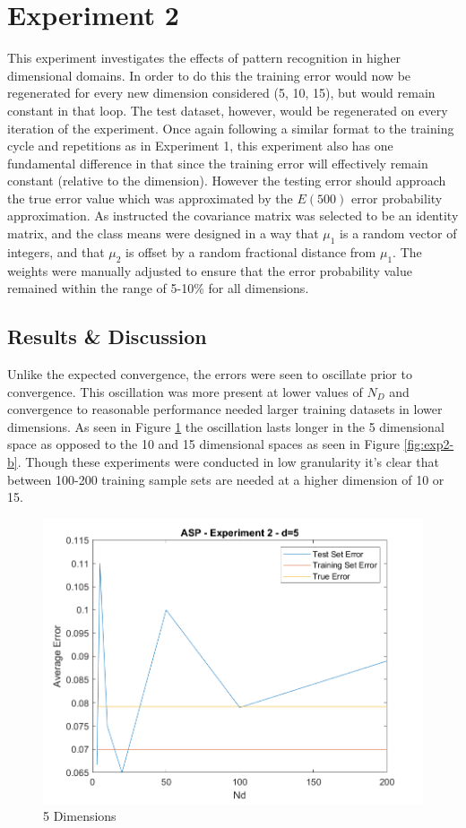 \section{Experiment 2}
This experiment investigates the effects of pattern recognition in higher dimensional domains. In order to do this the training error would now be regenerated for every new dimension considered (5, 10, 15), but would remain constant in that loop. The test dataset, however, would be regenerated on every iteration of the experiment. Once again following a similar format to the training cycle and repetitions as in Experiment 1, this experiment also has one fundamental difference in that since the training error will effectively remain constant (relative to the dimension). However the testing error should approach the true error value which was approximated by the $E(500)$ error probability approximation. As instructed the covariance matrix was selected to be an identity matrix, and the class means were designed in a way that $\mu_{1}$ is a random vector of integers, and that $\mu_{2}$ is offset by a random fractional distance from $\mu_{1}$. The weights were manually adjusted to ensure that the error probability value remained within the range of 5-10\% for all dimensions.

\subsection{Results \& Discussion}
Unlike the expected convergence, the errors were seen to oscillate prior to convergence. This oscillation was more present at lower values of $N_{D}$ and convergence to reasonable performance needed larger training datasets in lower dimensions. As seen in Figure \ref{fig:exp2-a} the oscillation lasts longer in the 5 dimensional space as opposed to the 10 and 15 dimensional spaces as seen in Figure \ref{fig:exp2-b}. Though these experiments were conducted in low granularity it's clear that between 100-200 training sample sets are needed at a higher dimension of 10 or 15. 

\begin{figure}[H]
	\centering
	\includegraphics[width=.8\linewidth]{./code/Exp2-results/ErrorComparison_5.png}
	\caption{5 Dimensions}
	\label{fig:exp2-a}
\end{figure}

